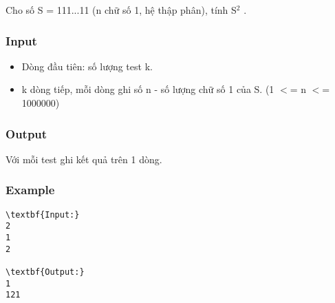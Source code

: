 

Cho số S = 111...11 (n chữ số 1, hệ thập phân), tính S$^2 $ .

\subsubsection{Input}
\begin{itemize}
	\item Dòng đầu tiên: số lượng test k.
	\item k dòng tiếp, mỗi dòng ghi số n - số lượng chữ số 1 của S. (1 $<$= n $<$= 1000000)
\end{itemize}

\subsubsection{Output}

Với mỗi test ghi kết quả trên 1 dòng.

\subsubsection{Example}
\begin{verbatim}
\textbf{Input:}
2
1
2

\textbf{Output:}
1
121
\end{verbatim}